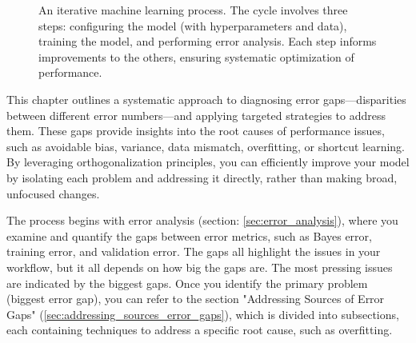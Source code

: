 \documentclass[12pt,openany]{book}
\begin{document}
\begin{figure}[h!]
\centering
{}
\caption{An iterative machine learning process. The cycle involves three steps: configuring the model (with hyperparameters and data), training the model, and performing error analysis. Each step informs improvements to the others, ensuring systematic optimization of performance.}
\label{fig:ml_cycle}
\end{figure}

This chapter outlines a systematic approach to diagnosing error gaps—disparities between different error numbers—and applying targeted strategies to address them. These gaps provide insights into the root causes of performance issues, such as avoidable bias, variance, data mismatch, overfitting, or shortcut learning. By leveraging orthogonalization principles, you can efficiently improve your model by isolating each problem and addressing it directly, rather than making broad, unfocused changes. \newline

The process begins with error analysis (section: \ref{sec:error_analysis}), where you examine and quantify the gaps between error metrics, such as Bayes error, training error, and validation error. The gaps all highlight the issues in your workflow, but it all depends on how big the gaps are. The most pressing issues are indicated by the biggest gaps. Once you identify the primary problem (biggest error gap), you can refer to the section "Addressing Sources of Error Gaps" (\ref{sec:addressing_sources_error_gaps}), which is divided into subsections, each containing techniques to address a specific root cause, such as overfitting. \newline
\end{document}
